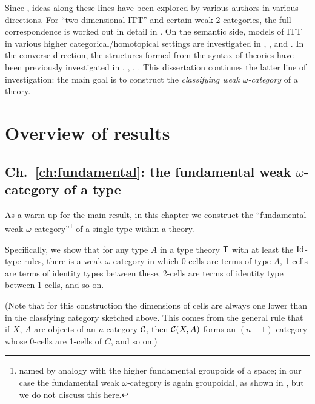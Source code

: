 \begin{para}
Since \cite{hofmann-streicher}, ideas along these lines have been explored by various authors in various directions.  For ``two-dimensional ITT'' and certain weak 2-categories, the full correspondence is worked out in detail in \cite{garner:2d-models}.  On the semantic side, models of ITT in various higher categorical/homotopical settings are investigated in \cite{awodey-warren}, \cite{warren:thesis}, and \cite{garner-van-den-berg:models}.  In the converse direction, the structures formed from the syntax of theories have been previously investigated in \cite{gambino-garner}, \cite{lumsdaine:lmcs}, \cite{garner-van-den-berg}, \cite{awodey-hofstra-warren}.  This dissertation continues the latter line of investigation: the main goal is to construct the \emph{classifying weak $\omega$-category} of a theory.
\end{para}


\section{Overview of results}

\subsection*{Ch.~\ref{ch:fundamental}: the fundamental weak $\omega$-category of a type}

\begin{para}As a warm-up for the main result, in this chapter we construct the ``fundamental weak $\omega$-category''\footnote{named by analogy with the higher fundamental groupoids of a space; in our case the fundamental weak $\omega$-category is again groupoidal, as shown in \cite{garner-van-den-berg}, but we do not discuss this here.} of a single type within a theory.  

Specifically, we show that for any type $A$ in a type theory $\mathsf{T}$ with at least the $\mathrm{Id}$-type rules, there is a weak $\omega$-category in which 0-cells are terms of type $A$, 1-cells are terms of identity types between these, 2-cells are terms of identity type between 1-cells, and so on.

(Note that for this construction the dimensions of cells are always one lower than in the classfying category sketched above.  This comes from the general rule that if $X$, $A$ are objects of an $n$-category $\mathcal{C}$, then $\mathcal{C}(X,A)$ forms an $(n-1)$-category whose 0-cells are 1-cells of $C$, and so on.)
\end{para}

